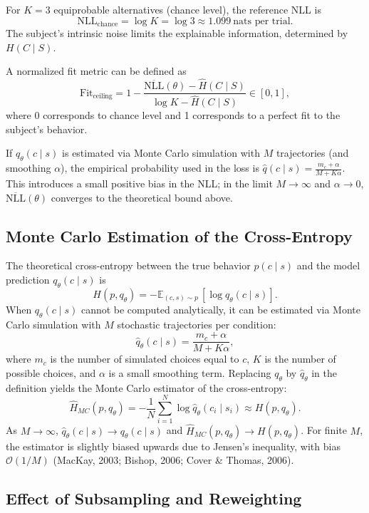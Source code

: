 \documentclass[11pt,a4paper]{article}
\begin{document}
For $K=3$ equiprobable alternatives (chance level), the reference NLL is
\[
\mathrm{NLL}_{\text{chance}} = \log K = \log 3 \approx 1.099
\ \text{nats per trial.}
\]
The subject’s intrinsic noise limits the explainable information, determined by
$H(C \mid S)$.

A normalized fit metric can be defined as
\[
\mathrm{Fit}_{\text{ceiling}}
= 1 -
\frac{\overline{\mathrm{NLL}}(\theta) - \widehat{H}(C \mid S)}
{\log K - \widehat{H}(C \mid S)} \in [0,1],
\]
where 0 corresponds to chance level and 1 corresponds to a perfect fit
to the subject’s behavior.

If $q_\theta(c \mid s)$ is estimated via Monte Carlo simulation with $M$
trajectories (and smoothing $\alpha$), the empirical probability used in the loss is
$\widehat{q}(c \mid s) = \frac{m_c+\alpha}{M+K\alpha}$.
This introduces a small positive bias in the NLL;
in the limit $M\!\to\!\infty$ and $\alpha\!\to\!0$,
$\overline{\mathrm{NLL}}(\theta)$ converges to the theoretical bound above.


\subsection*{Monte Carlo Estimation of the Cross-Entropy}

The theoretical cross-entropy between the true behavior $p(c\mid s)$ and the
model prediction $q_\theta(c\mid s)$ is
\[
H(p,q_\theta)
= -\mathbb{E}_{(c,s)\sim p}\,[\log q_\theta(c\mid s)].
\]
When $q_\theta(c\mid s)$ cannot be computed analytically, it can be estimated
via Monte Carlo simulation with $M$ stochastic trajectories per condition:
\[
\widehat{q}_\theta(c\mid s)
= \frac{m_c + \alpha}{M + K\alpha},
\]
where $m_c$ is the number of simulated choices equal to $c$,
$K$ is the number of possible choices, and $\alpha$ is a small smoothing term.
Replacing $q_\theta$ by $\widehat q_\theta$ in the definition yields the
Monte Carlo estimator of the cross-entropy:
\[
\widehat{H}_{MC}(p,q_\theta)
= -\frac{1}{N}\sum_{i=1}^N \log \widehat q_\theta(c_i\mid s_i)
\approx H(p,q_\theta).
\]
As $M\!\to\!\infty$, $\widehat q_\theta(c\mid s)\!\to\! q_\theta(c\mid s)$ and
$\widehat{H}_{MC}(p,q_\theta)\!\to\! H(p,q_\theta)$.
For finite $M$, the estimator is slightly biased upwards due to Jensen's
inequality, with bias $\mathcal{O}(1/M)$
(MacKay, 2003; Bishop, 2006; Cover \& Thomas, 2006).

\subsection*{Effect of Subsampling and Reweighting}
\end{document}
